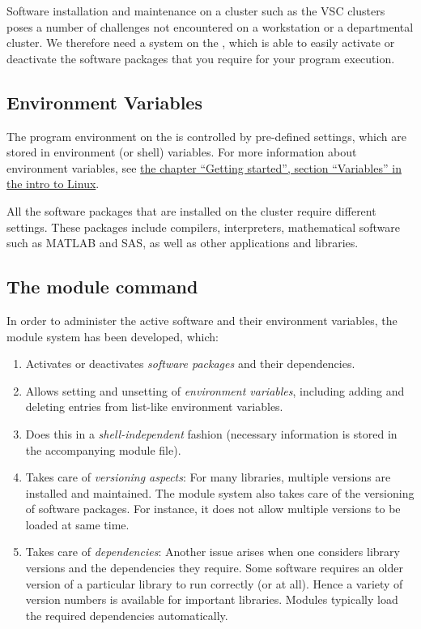 Software installation and maintenance on a \hpc cluster such as the VSC
clusters poses a number of challenges not encountered on a workstation or a
departmental cluster. We therefore need a system on the \hpc, which is able
to easily activate or deactivate the software packages that you require for
your program execution.

\subsection{Environment Variables}

The program environment on the \hpc is controlled by pre-defined settings,
which are stored in environment (or shell) variables. For more information about environment variables, see
\href{\LinuxManualURL#sec:environment-variables}{the chapter ``Getting started'', section ``Variables'' in the intro to Linux}.

All the software packages that are installed on the \hpc cluster require
different settings. These packages include compilers, interpreters,
mathematical software such as MATLAB and SAS, as well as other applications and
libraries.

\subsection{The module command}

In order to administer the active software and their environment variables,
the module system has been developed, which:

\begin{enumerate}
\item  Activates or deactivates \emph{software packages} and their dependencies.
\item  Allows setting and unsetting of \emph{environment variables}, including
    adding and deleting entries from list-like environment variables.
\item  Does this in a \emph{shell-independent} fashion (necessary information
    is stored in the accompanying module file).
\item  Takes care of \emph{versioning aspects}: For many libraries, multiple
    versions are installed and maintained. The module system also takes care of
    the versioning of software packages. For instance, it does not allow multiple
    versions to be loaded at same time.
\item  Takes care of \emph{dependencies}: Another issue arises when one considers
    library versions and the dependencies they require. Some software requires an
    older version of a particular library to run correctly (or at all). Hence a
    variety of version numbers is available for important libraries. Modules
    typically load the required dependencies automatically.
\end{enumerate}

